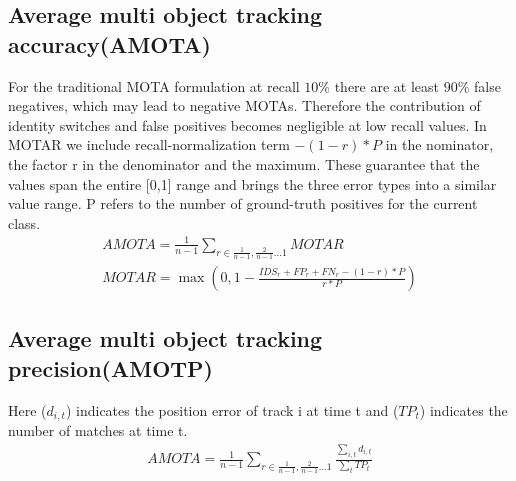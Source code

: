     \subsection{Average multi object tracking accuracy(AMOTA)}
        For the traditional MOTA formulation at recall \(10\%\) there are at least \(90\%\) false negatives, which may lead to negative MOTAs. Therefore the contribution of identity switches and false positives becomes negligible at low recall values. In MOTAR we include recall-normalization term \emph{\(- (1-r) * P\)} in the nominator, the factor r in the denominator and the maximum. 
        These guarantee that the values span the entire [0,1] range and brings the three error types into a similar value range. P refers to the number of ground-truth positives for the current class.
        \begin{align}
            AMOTA = \frac{1}{n - 1} \sum_{r \in {\frac{1}{n - 1}, \frac{2}{n - 1} ... 1}} MOTAR \\ 
            MOTAR = \max(0, 1 - \frac{IDS_r + FP_r + FN_r - (1 - r) * P}{r*P})
        \end{align}
    \subsection{Average multi object tracking precision(AMOTP)}
        Here ($d_{i,t}$) indicates the position error of track i at time t and ($TP_t$) indicates the number of matches at time t.
        \begin{align}
            AMOTA = \frac{1}{n - 1} \sum_{r \in {\frac{1}{n - 1}, \frac{2}{n - 1} ... 1}}\frac{\sum_{i, t} d_{i, t}}{\sum_{t} TP_t}
        \end{align}
